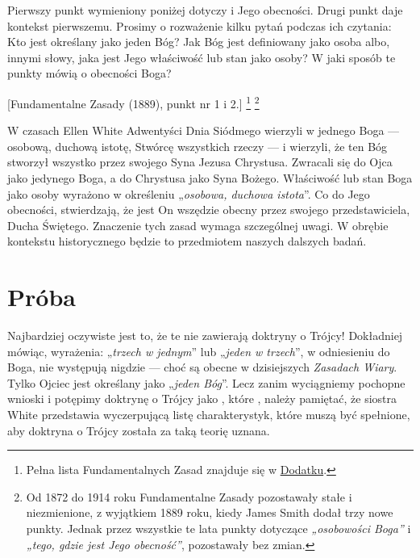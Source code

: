Pierwszy punkt wymieniony poniżej dotyczy  i Jego obecności. Drugi punkt daje kontekst pierwszemu. Prosimy o rozważenie kilku pytań podczas ich czytania: Kto jest określany jako jeden Bóg? Jak Bóg jest definiowany jako osoba albo, innymi słowy, jaka jest Jego właściwość lub stan jako osoby? W jaki sposób te punkty mówią o obecności Boga?


[Fundamentalne Zasady (1889), punkt nr 1 i 2.] \footnote{Pełna lista Fundamentalnych Zasad znajduje się w \hyperref[chap:appendix]{Dodatku}.} \footnote{Od 1872 do 1914 roku Fundamentalne Zasady pozostawały stałe i niezmienione, z wyjątkiem 1889 roku, kiedy James Smith dodał trzy nowe punkty. Jednak przez wszystkie te lata punkty dotyczące \textit{„osobowości Boga”} i \textit{„tego, gdzie jest Jego obecność”}, pozostawały bez zmian.}

W czasach Ellen White Adwentyści Dnia Siódmego wierzyli w jednego Boga — osobową, duchową istotę, Stwórcę wszystkich rzeczy — i wierzyli, że ten Bóg stworzył wszystko przez swojego Syna Jezusa Chrystusa. Zwracali się do Ojca jako jedynego Boga, a do Chrystusa jako Syna Bożego. Właściwość lub stan Boga jako osoby wyrażono w określeniu „\textit{osobowa, duchowa istota}”. Co do Jego obecności,  stwierdzają, że jest On wszędzie obecny przez swojego przedstawiciela, Ducha Świętego. Znaczenie tych zasad wymaga szczególnej uwagi. W obrębie kontekstu historycznego będzie to przedmiotem naszych dalszych badań.

\section*{Próba}

Najbardziej oczywiste jest to, że te  nie zawierają doktryny o Trójcy! Dokładniej mówiąc, wyrażenia: „\textit{trzech w jednym}” lub „\textit{jeden w trzech}”, w odniesieniu do Boga, nie występują nigdzie — choć są obecne w dzisiejszych \textit{Zasadach Wiary}. Tylko Ojciec jest określany jako „\textit{jeden Bóg}”. Lecz zanim wyciągniemy pochopne wnioski i potępimy doktrynę o Trójcy jako , które , należy pamiętać, że siostra White przedstawia wyczerpującą listę charakterystyk, które muszą być spełnione, aby doktryna o Trójcy została za taką teorię uznana.

